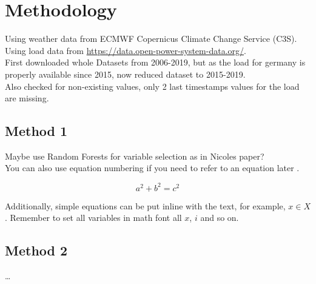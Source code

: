 \chapter{Methodology}
\label{ch:methods}


Using weather data from ECMWF Copernicus Climate Change Service (C3S).\\
Using load data from \url{https://data.open-power-system-data.org/}.\\
First downloaded whole Datasets from 2006-2019, but as the load for germany is properly available since 2015, now reduced dataset to 2015-2019.\\
Also checked for non-existing values, only 2 last timestamps values for the load are missing.\\

\section{Method 1}

Maybe use Random Forests for variable selection as in Nicoles paper? \Parencite{Ludwig2015}\\


You can also use equation numbering if you need to refer to an equation later \eg {}.


\begin{equation}
a^2 + b^2 = c^2
\label{eq:ex1}
\end{equation}

Additionally, simple equations can be put inline with the text, for example, $x \in X$. Remember to set all variables in math font \ie all $x$, $i$ and so on.

\section{Method 2}

\dots

